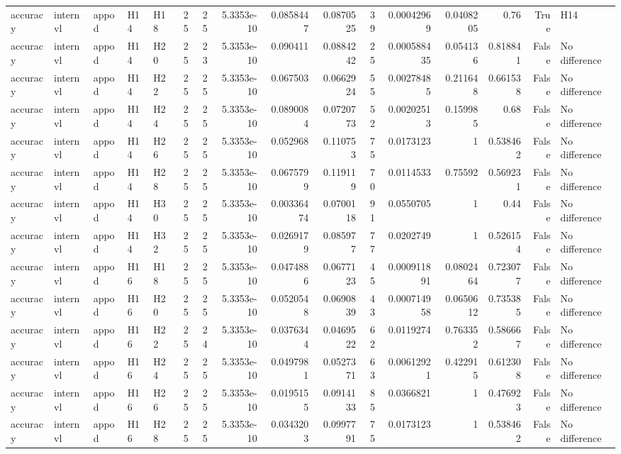 \begin{longtable}{lllllrrrrrrrrrrl}
accuracy & internvl & appod & H14 & H18 & 25 & 25 & 5.3353e-10 & 0.0858447 & 0.0870525 & 39 & 0.00042969 & 0.0408205 & 0.76 & True & H14 \\
accuracy & internvl & appod & H14 & H20 & 25 & 23 & 5.3353e-10 & 0.090411 & 0.0884242 & 25 & 0.000588435 & 0.054136 & 0.818841 & False & No difference \\
accuracy & internvl & appod & H14 & H22 & 25 & 25 & 5.3353e-10 & 0.067503 & 0.0662924 & 55 & 0.00278485 & 0.211648 & 0.661538 & False & No difference \\
accuracy & internvl & appod & H14 & H24 & 25 & 25 & 5.3353e-10 & 0.0890084 & 0.0720773 & 52 & 0.00202513 & 0.159985 & 0.68 & False & No difference \\
accuracy & internvl & appod & H14 & H26 & 25 & 25 & 5.3353e-10 & 0.052968 & 0.110753 & 75 & 0.0173123 & 1 & 0.538462 & False & No difference \\
accuracy & internvl & appod & H14 & H28 & 25 & 25 & 5.3353e-10 & 0.0675799 & 0.119119 & 70 & 0.0114533 & 0.75592 & 0.569231 & False & No difference \\
accuracy & internvl & appod & H14 & H30 & 25 & 25 & 5.3353e-10 & 0.00336474 & 0.0700118 & 91 & 0.0550705 & 1 & 0.44 & False & No difference \\
accuracy & internvl & appod & H14 & H32 & 25 & 25 & 5.3353e-10 & 0.0269179 & 0.085977 & 77 & 0.0202749 & 1 & 0.526154 & False & No difference \\
accuracy & internvl & appod & H16 & H18 & 25 & 25 & 5.3353e-10 & 0.0474886 & 0.0677123 & 45 & 0.000911891 & 0.0802464 & 0.723077 & False & No difference \\
accuracy & internvl & appod & H16 & H20 & 25 & 25 & 5.3353e-10 & 0.0520548 & 0.0690839 & 43 & 0.000714958 & 0.0650612 & 0.735385 & False & No difference \\
accuracy & internvl & appod & H16 & H22 & 25 & 24 & 5.3353e-10 & 0.0376344 & 0.0469522 & 62 & 0.0119274 & 0.763352 & 0.586667 & False & No difference \\
accuracy & internvl & appod & H16 & H24 & 25 & 25 & 5.3353e-10 & 0.0497981 & 0.0527371 & 63 & 0.00612921 & 0.422915 & 0.612308 & False & No difference \\
accuracy & internvl & appod & H16 & H26 & 25 & 25 & 5.3353e-10 & 0.0195155 & 0.0914133 & 85 & 0.0366821 & 1 & 0.476923 & False & No difference \\
accuracy & internvl & appod & H16 & H28 & 25 & 25 & 5.3353e-10 & 0.0343203 & 0.0997791 & 75 & 0.0173123 & 1 & 0.538462 & False & No difference \\

\end{longtable}
